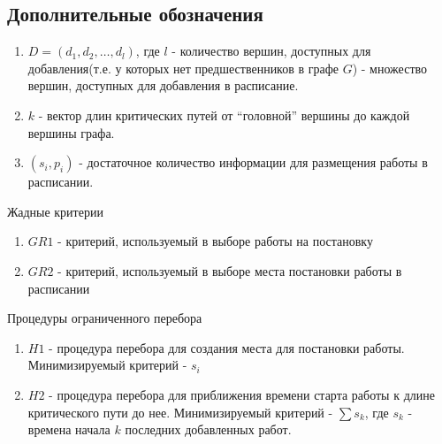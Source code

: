 \subsection{Дополнительные обозначения}
\begin{enumerate}
    \item $D= \left( d_1, d_2, \dots, d_l \right)$, где $l$ - количество вершин, доступных для добавления(т.е. у которых нет предшественников в графе $G$) - множество вершин, доступных для добавления в расписание.
    \item $k$ - вектор длин критических путей от ``головной'' вершины до каждой вершины графа.
    \item $\left( s_i, p_i \right)$ - достаточное количество информации для размещения работы в расписании.
\end{enumerate}
Жадные критерии
\begin{enumerate}
    \item $GR1$ - критерий, используемый в выборе работы на постановку
    \item $GR2$ - критерий, используемый в выборе места постановки работы в расписании
\end{enumerate}
Процедуры ограниченного перебора
\begin{enumerate}
    \item $H1$ - процедура перебора для создания места для постановки работы. Минимизируемый критерий - $s_i$
    \item $H2$ - процедура перебора для приближения времени старта работы к длине критического пути до нее. Минимизируемый критерий - $\sum s_k$, где $s_k$ - времена начала $k$ последних добавленных работ.
\end{enumerate}

